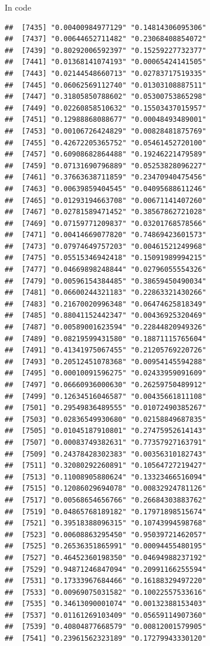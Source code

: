 \documentclass[ignorenonframetext,]{beamer}
\begin{document}
\begin{frame}[fragile]{In code}
\begin{verbatim}
##  [7435] "0.00400984977129" "0.14814306095306"
##  [7437] "0.00644652711482" "0.23068408854072"
##  [7439] "0.80292006592397" "0.15259227732377"
##  [7441] "0.01368141074193" "0.00065424141505"
##  [7443] "0.02144548660713" "0.02783717519335"
##  [7445] "0.06062569112740" "0.01303108887511"
##  [7447] "0.31805850788602" "0.05300753865298"
##  [7449] "0.02260858510632" "0.15503437015957"
##  [7451] "0.12988868088677" "0.00048493489001"
##  [7453] "0.00106726424829" "0.00828481875769"
##  [7455] "0.42672205365752" "0.05461452720100"
##  [7457] "0.60908682864488" "0.19246221479589"
##  [7459] "0.07131690796889" "0.05253828096227"
##  [7461] "0.37663638711859" "0.23470940475456"
##  [7463] "0.00639859404545" "0.04095688611246"
##  [7465] "0.01293194663708" "0.00671141407260"
##  [7467] "0.02781589471452" "0.38567862721028"
##  [7469] "0.07159771209837" "0.03201768578566"
##  [7471] "0.00414669077820" "0.74869423601573"
##  [7473] "0.07974649757203" "0.00461521249968"
##  [7475] "0.05515346942418" "0.15091989994215"
##  [7477] "0.04669898248844" "0.02796055554326"
##  [7479] "0.00596154384485" "0.38659450490034"
##  [7481] "0.06600244321183" "0.22863321430266"
##  [7483] "0.21670020996348" "0.06474625818349"
##  [7485] "0.88041152442347" "0.00436925320469"
##  [7487] "0.00589001623594" "0.22844820949326"
##  [7489] "0.08219599431580" "0.18871115765604"
##  [7491] "0.41341975067455" "0.21205769220726"
##  [7493] "0.20512451078368" "0.00954145594288"
##  [7495] "0.00010091596275" "0.02433959091609"
##  [7497] "0.06660936000630" "0.26259750489912"
##  [7499] "0.12634516046587" "0.00435661811108"
##  [7501] "0.29549836489555" "0.01072490385267"
##  [7503] "0.02836549930680" "0.02158849687835"
##  [7505] "0.01045187910801" "0.27475952614143"
##  [7507] "0.00083749382631" "0.77357927163791"
##  [7509] "0.24378428302383" "0.00356310182743"
##  [7511] "0.32080292260891" "0.10564727219427"
##  [7513] "0.11008905880624" "0.13323466516094"
##  [7515] "0.12086029694078" "0.00832924781126"
##  [7517] "0.00568654656766" "0.26684303883762"
##  [7519] "0.04865768189182" "0.17971898515674"
##  [7521] "0.39518388096315" "0.10743994598768"
##  [7523] "0.00608863295450" "0.95039721462057"
##  [7525] "0.26536351865991" "0.00094455480195"
##  [7527] "0.46452360198350" "0.04694988237192"
##  [7529] "0.94871246847094" "0.20991166255594"
##  [7531] "0.17333967684466" "0.16188329497220"
##  [7533] "0.00969075031582" "0.10022557533616"
##  [7535] "0.34613090001074" "0.00132388153403"
##  [7537] "0.01161269103409" "0.05659114907360"
##  [7539] "0.40804877668579" "0.00812001579905"
##  [7541] "0.23961562323189" "0.17279943330120"

\end{verbatim}
\end{frame}
\end{document}
